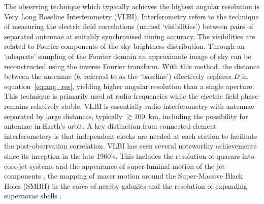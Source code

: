 The observing technique which typically achieves the highest angular resolution is Very Long Baseline Interferometry (VLBI). Interferometry refers to the technique of measuring the electric field correlations (named `visibilities') between pairs of separated antennae at suitably synchronised timing accuracy. The visibilities are related to Fourier components of the sky brightness distribution. Through an `adequate' sampling of the Fourier domain an approximate image of sky can be reconstructed using the inverse Fourier transform. With this method, the distance between the antennae ($b$, referred to as the `baseline') effectively replaces $D$ in equation~\ref{eq:ang_res}, yielding higher angular resolution than a single aperture. This technique is primarily used at radio frequencies while the electric field phase remains relatively stable. VLBI is essentially radio interferometry with antennae separated by large distances, typically $\gtrsim 100$~km, including the possibility for antennae in Earth's orbit. A key distinction from connected-element interferometery is that independent clocks are needed at each station to facilitate the post-observation correlation. VLBI has seen several noteworthy achievements since its inception in the late 1960's. This includes the resolution of quasars into core-jet systems and the appearance of super-luminal motion of the jet components \citep[e.g.][]{Whitney_1971}, the mapping of maser motion around the Super-Massive Black Holes (SMBH) in the cores of nearby galaxies \citep[e.g.][]{Miyoshi_1995} and the resolution of expanding supernovae shells \citep[e.g.][]{Pedlar_1999}.


